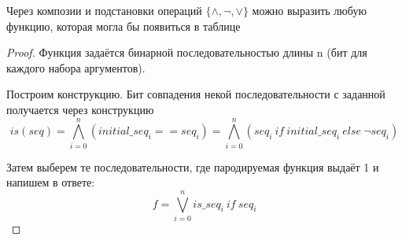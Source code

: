 \documentclass[a4paper, 12pt]{article}
\begin{document}
    \begin{theorem}
        Через композии и подстановки операций $\{ \land, \lnot, \lor  \}$ можно выразить любую функцию, которая могла бы появиться в таблице
    \end{theorem}
    \begin{proof}
        Функция задаётся бинарной последовательностью длины n (бит для каждого набора аргументов).

        Построим конструкцию. 
        Бит совпадения некой последовательности с заданной получается через конструкцию 
        \begin{equation}
            is(seq) = \bigwedge_{i=0}^{n} (initial\_seq_i == seq_i) = \bigwedge_{i=0}^{n} (seq_i ~ if ~ initial\_seq_i ~ else ~ \lnot seq_i)
        \end{equation}
    
        Затем выберем те последовательности, где пародируемая функция выдаёт 1 и напишем в ответе:
        \begin{equation}
            f = \bigvee_{i = 0}^{n} is\_seq_i ~ if ~ seq_i
        \end{equation}
    \end{proof}
\end{document}

